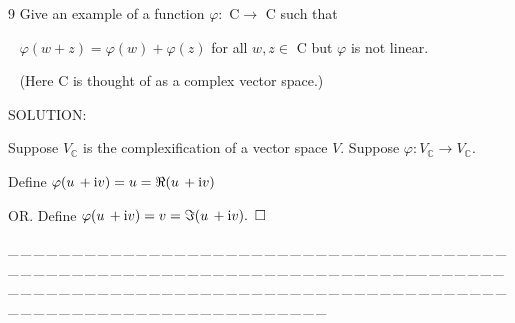 \documentclass[a4paper, 11pt, UTF8]{article}
\def\i{\textup{i}}
\begin{document}
\begin{large}
{\timesbf\Large 9} {\timessl\Large 
Give an example of a function $\varphi:$ {\timesbf C}$\rightarrow$ {\timesbf C} such that}\par\,\,\,
{\timessl\Large
 $\varphi(w + z) = \varphi(w) + \varphi(z)$ for all $w, z\in$ {\timesbf C} but $\varphi$ is not linear.}\par\,\,\,
{\timessl (Here {\timesbf C} is thought of as a complex vector space.)
}\par
{\timesbf S\footnotesize{OLUTION:}}\par\quad
Suppose $V_\mathbb{C}$ is the complexification of a vector space $V$. Suppose $\varphi:V_\mathbb{C}\rightarrow V_\mathbb{C}.$\par\quad
Define $\varphi(u\,+\i v)=u=\Re(u\,+\i v)$\par\quad
O{\small R}. Define $\varphi(u\,+\i v)=v=\Im(u\,+\i v).\,\,\,\square$\par
{\tiny \_\,\_\,\_\,\_\,\_\,\_\,\_\,\_\,\_\,\_\,\_\,\_\,\_\,\_\,\_\,\_\,\_\,\_\,\_\,\_\,\_\,\_\,\_\,\_\,\_\,\_\,\_\,\_\,\_\,\_\,\_\,\_\,\_\,\_\,\_\,\_\,\_\,\_\,\_\,\_\,\_\,\_\,\_\,\_\,\_\,\_\,\_\,\_\,\_\,\_\,\_\,\_\,\_\,\_\,\_\,\_\,\_\,\_\,\_\,\_\,\_\,\_\,\_\,\_\,\_\,\_\,\_\,\_\,\_\,\_\,\_\_\,\_\,\_\,\_\,\_\,\_\,\_\,\_\,\_\,\_\,\_\,\_\,\_\,\_\,\_\,\_\,\_\,\_\,\_\,\_\,\_\,\_\,\_\,\_\,\_\,\_\,\_\,\_\,\_\,\_\,\_\,\_\,\_\,\_\,\_\,\_\,\_\,\_\,\_\,\_\,\_\,\_\,\_\,\_\,\_\,\_\,\_\,\_\,\_\,\_\,\_\,\_\,\_\,\_\,\_\,\_\,\_\,\_\,\_\,\_\,\_\,\_\,\_\,\_\,\_\,\_\,\_\,\_\,\_\,\_\,\_}{\tiny\,\par}


\end{large}
\end{document}
